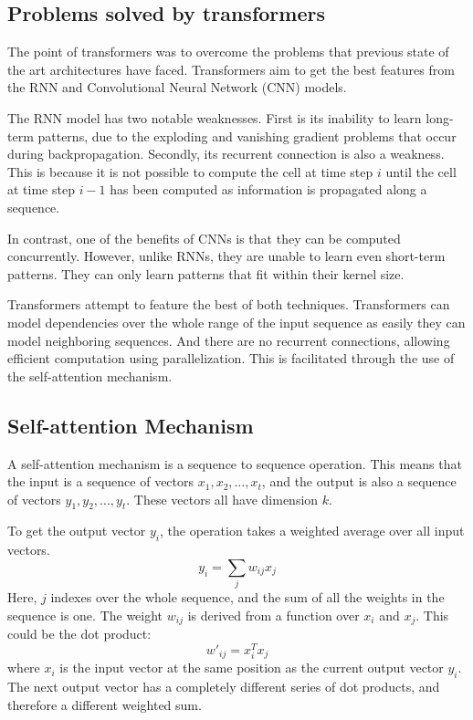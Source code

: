 \subsection{Problems solved by transformers}
The point of transformers was to overcome the problems that previous state of the art architectures have faced. Transformers aim to get the best features from the RNN and Convolutional Neural Network (CNN) models.

The RNN model has two notable weaknesses. First is its inability to learn long-term patterns, due to the exploding and vanishing gradient problems that occur during backpropagation.
Secondly, its recurrent connection is also a weakness. This is because it is not possible to compute the cell at time step $i$ until the cell at time step $i-1$ has been computed as information is propagated along a sequence.

In contrast, one of the benefits of CNNs is that they can be computed concurrently. However, unlike RNNs, they are unable to learn even short-term patterns. They can only learn patterns that fit within their kernel size.

Transformers attempt to feature the best of both techniques.
Transformers can model dependencies over the whole range of the input sequence as easily they can model neighboring sequences. And there are no recurrent connections, allowing efficient computation using parallelization. This is facilitated through the use of the self-attention mechanism.\cite{TransformersScratchPeterbloem}


\subsection{Self-attention Mechanism}
A self-attention mechanism is a sequence to sequence operation. This means that the input is a sequence of vectors $x_{1},x_{2},\ldots, x_{t}$, and the output is also a sequence of vectors $y_{1},y_{2},\ldots, y_{t}$.
These vectors all have dimension $k$.

To get the output vector $y_{i}$, the operation takes a weighted average over all input vectors.
$$
y_{i}=\sum_{j}w_{ij}x_{j}
$$
Here, $j$ indexes over the whole sequence, and the sum of all the weights in the sequence is one.
The weight $w_{ij}$ is derived from a function over $x_{i}$ and $x_{j}$.
This could be the dot product:
$$
w'_{ij}=x_{i}^Tx_{j}
$$
where $x_{i}$ is the input vector at the same position as the current output vector $y_{i}$.
The next output vector has a completely different series of dot products, and therefore a different weighted sum.

